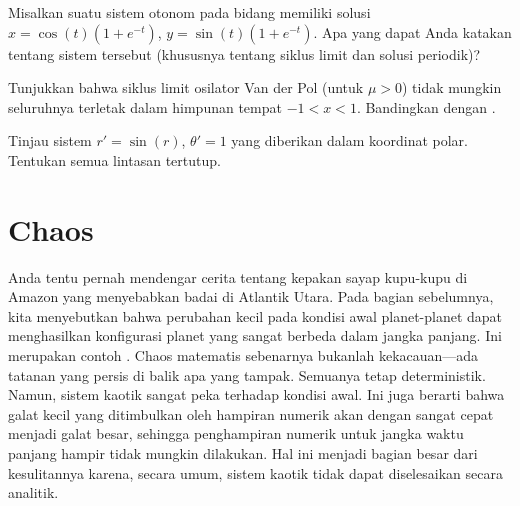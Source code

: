 \begin{exercise}
Misalkan suatu sistem otonom pada bidang memiliki solusi
$x=\cos(t)(1+e^{-t})$, $y=\sin(t)(1+e^{-t})$. Apa yang dapat Anda katakan
tentang sistem tersebut (khususnya tentang siklus limit dan solusi periodik)?
\end{exercise}

\begin{exercise}
Tunjukkan bahwa siklus limit osilator Van der Pol (untuk $\mu > 0$)
tidak mungkin seluruhnya terletak dalam himpunan tempat $-1 < x < 1$.
Bandingkan dengan .
\end{exercise}

\begin{exercise}
Tinjau sistem $r' = \sin(r)$, $\theta' = 1$ yang diberikan dalam koordinat
polar. Tentukan semua lintasan tertutup.
\end{exercise}



\sectionnewpage
\section{Chaos} \label{sec:chaos}



Anda tentu pernah mendengar cerita tentang kepakan sayap kupu-kupu di
Amazon yang menyebabkan badai di Atlantik Utara.  Pada bagian sebelumnya,
kita menyebutkan bahwa perubahan kecil pada kondisi awal planet-planet dapat
menghasilkan konfigurasi planet yang sangat berbeda dalam jangka panjang.
Ini merupakan contoh
\emph{}.
Chaos matematis sebenarnya bukanlah kekacauan---ada tatanan yang persis di
balik apa yang tampak.  Semuanya tetap deterministik.  Namun, sistem kaotik
sangat peka terhadap kondisi awal.  Ini juga berarti bahwa galat kecil yang
ditimbulkan oleh hampiran numerik akan dengan sangat cepat menjadi galat
besar, sehingga penghampiran numerik untuk jangka waktu panjang hampir tidak
mungkin dilakukan.  Hal ini menjadi bagian besar dari kesulitannya karena,
secara umum, sistem kaotik tidak dapat diselesaikan secara analitik.


